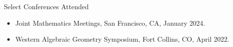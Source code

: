 \documentclass[
	11pt, %
]{resume} %
\begin{document}

\begin{rSection}{Select Conferences Attended}

	\begin{itemize}
		\item{Joint Mathematics Meetings, San Francisco, CA, January 2024.}
		\item{Western Algebraic Geometry Symposium, Fort Collins, CO, April 2022.}
	\end{itemize}
	
\end{rSection}






\fancyfoot{}
\end{document}
